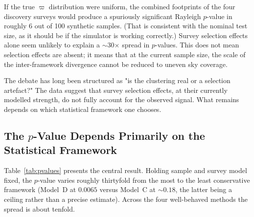 \documentclass[usenatbib]{mnras}
\begin{document}
If the true $\varpi$ distribution were uniform, the combined footprints of the four discovery surveys would produce a spuriously significant Rayleigh $p$-value in roughly 6 out of 100 synthetic samples. (That is consistent with the nominal test size, as it should be if the simulator is working correctly.) Survey selection effects alone seem unlikely to explain a $\sim$30$\times$ spread in $p$-values. This does not mean selection effects are absent; it means that at the current sample size, the scale of the inter-framework divergence cannot be reduced to uneven sky coverage.

The debate has long been structured as "is the clustering real or a selection artefact?" The data suggest that survey selection effects, at their currently modelled strength, do not fully account for the observed signal. What remains depends on which statistical framework one chooses.

\subsection{The $p$-Value Depends Primarily on the Statistical Framework}

Table~\ref{tab:pvalues} presents the central result. Holding sample and survey model fixed, the $p$-value varies roughly thirtyfold from the most to the least conservative framework (Model~D at $0.0065$ versus Model~C at $\sim0.18$, the latter being a ceiling rather than a precise estimate). Across the four well-behaved methods the spread is about tenfold.
\end{document}
